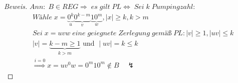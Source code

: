 \begin{proof}[Beweis]
	\begin{math}
		Ann:\;B\in REG\Rightarrow\;es\;gilt\;PL\Leftrightarrow\;Sei\;k\;Pumpingzahl:
	\end{math}
	\begin{align*}
		&Wähle\;x=\underbrace{0^k}_u\underbrace{0^{k-m}}_v\underbrace{10^m}_w,\mid x\mid\ge k,k>m\\
		&Sei\;x=uvw\;eine\;geiegnete\;Zerlegung\;gemäß\;PL:\mid v\mid\ge1,\mid uv\mid\le k\\
		&\mid v\mid=\underbrace{k-m\ge1}_{k>m}\text{ und }\mid uv\mid=k\le k\\
		&\overset{i=0}{\Longrightarrow}x=uv^0w=0^m10^m\notin B\quad\lightning
	\end{align*}
\end{proof}